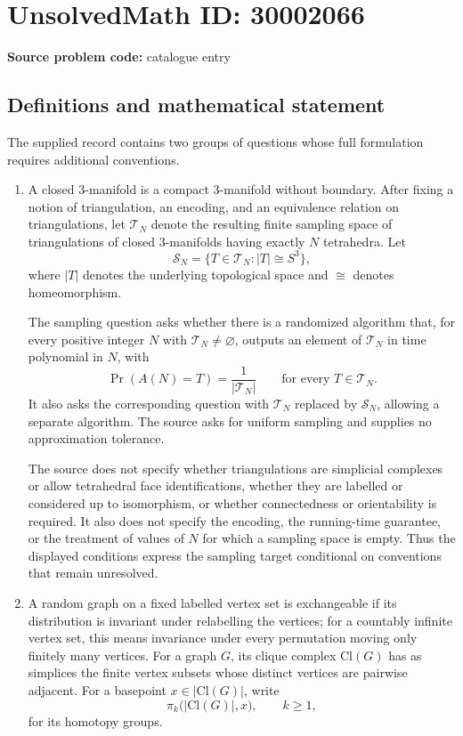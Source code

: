 \documentclass[11pt]{article}
\begin{document}
\section*{UnsolvedMath ID: 30002066}
\textbf{Source problem code:} catalogue entry
\subsection{Definitions and mathematical statement}
The supplied record contains two groups of questions whose full formulation requires additional conventions.

\begin{enumerate}
\item A closed \(3\)-manifold is a compact \(3\)-manifold without boundary. After fixing a notion of triangulation, an encoding, and an equivalence relation on triangulations, let \(\mathcal T_N\) denote the resulting finite sampling space of triangulations of closed \(3\)-manifolds having exactly \(N\) tetrahedra. Let
\[
\mathcal S_N=\{T\in\mathcal T_N:|T|\cong S^3\},
\]
where \(|T|\) denotes the underlying topological space and \(\cong\) denotes homeomorphism.

The sampling question asks whether there is a randomized algorithm that, for every positive integer \(N\) with \(\mathcal T_N\ne\varnothing\), outputs an element of \(\mathcal T_N\) in time polynomial in \(N\), with
\[
\Pr(A(N)=T)=\frac{1}{|\mathcal T_N|}
\qquad\text{for every }T\in\mathcal T_N.
\]
It also asks the corresponding question with \(\mathcal T_N\) replaced by \(\mathcal S_N\), allowing a separate algorithm. The source asks for uniform sampling and supplies no approximation tolerance.

The source does not specify whether triangulations are simplicial complexes or allow tetrahedral face identifications, whether they are labelled or considered up to isomorphism, or whether connectedness or orientability is required. It also does not specify the encoding, the running-time guarantee, or the treatment of values of \(N\) for which a sampling space is empty. Thus the displayed conditions express the sampling target conditional on conventions that remain unresolved.

\item A random graph on a fixed labelled vertex set is exchangeable if its distribution is invariant under relabelling the vertices; for a countably infinite vertex set, this means invariance under every permutation moving only finitely many vertices. For a graph \(G\), its clique complex \(\mathrm{Cl}(G)\) has as simplices the finite vertex subsets whose distinct vertices are pairwise adjacent. For a basepoint \(x\in|\mathrm{Cl}(G)|\), write
\[
\pi_k\bigl(|\mathrm{Cl}(G)|,x\bigr),\qquad k\geq 1,
\]
for its homotopy groups.


\end{enumerate}
\end{document}
